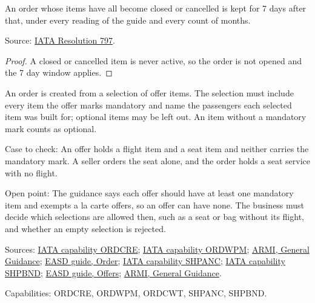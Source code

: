 \begin{theorem}
  \label{thm:order-creation-keep-after-final}
  An order whose items have all become closed or cancelled is kept for 7 days
  after that, under every reading of the guide and every count of months.

  Source: \href{https://www.iata.org/contentassets/72cbd60393ff42b5975d90ce9e049a7d/oneorder-resolution-797.pdf}{IATA Resolution 797}.
\end{theorem}
\begin{proof}
  A closed or cancelled item is never active, so the order is not opened and
  the 7 day window applies.
\end{proof}


\begin{definition}
  \label{def:order-creation-offer-item-selection}
  An order is created from a selection of offer items. The selection must
  include every item the offer marks mandatory and name the passengers each
  selected item was built for; optional items may be left out. An item
  without a mandatory mark counts as optional.

  Case to check: An offer holds a flight item and a seat item and neither
  carries the mandatory mark. A seller orders the seat alone, and the order
  holds a seat service with no flight.

  Open point: The guidance says each offer should have at least one
  mandatory item and exempts a la carte offers, so an offer can have none.
  The business must decide which selections are allowed then, such as a seat
  or bag without its flight, and whether an empty selection is rejected.

  Sources: \href{https://retailing.iata.org/armi/docs/ORDCRE/}{IATA capability ORDCRE};
  \href{https://retailing.iata.org/armi/docs/ORDWPM/}{IATA capability ORDWPM};
  \href{https://standards.atlassian.net/wiki/spaces/ARMI/pages/584318980/General+Guidance}{ARMI, General Guidance};
  \href{https://standards.atlassian.net/wiki/spaces/EASD/pages/574849062/Order}{EASD guide, Order};
  \href{https://retailing.iata.org/armi/docs/SHPANC/}{IATA capability SHPANC};
  \href{https://retailing.iata.org/armi/docs/SHPBND/}{IATA capability SHPBND};
  \href{https://standards.atlassian.net/wiki/spaces/EASD/pages/600637464}{EASD guide, Offers};
  \href{https://standards.atlassian.net/wiki/spaces/ARMI/pages/584318980}{ARMI, General Guidance}.

  Capabilities: ORDCRE, ORDWPM, ORDCWT, SHPANC, SHPBND.
\end{definition}

